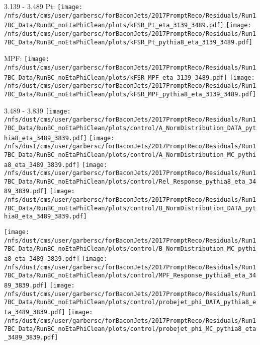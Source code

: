 \documentclass[t,compress]{beamer}
\begin{document}
\begin{frame}{3.139 - 3.489}
	 Pt: \texttt{[image: /nfs/dust/cms/user/garbersc/forBaconJets/2017PromptReco/Residuals/Run17BC\_Data/RunBC\_noEtaPhiClean/plots/kFSR\_Pt\_eta\_3139\_3489.pdf]}
	\texttt{[image: /nfs/dust/cms/user/garbersc/forBaconJets/2017PromptReco/Residuals/Run17BC\_Data/RunBC\_noEtaPhiClean/plots/kFSR\_Pt\_pythia8\_eta\_3139\_3489.pdf]}
\newline

	 MPF: \texttt{[image: /nfs/dust/cms/user/garbersc/forBaconJets/2017PromptReco/Residuals/Run17BC\_Data/RunBC\_noEtaPhiClean/plots/kFSR\_MPF\_eta\_3139\_3489.pdf]}
	\texttt{[image: /nfs/dust/cms/user/garbersc/forBaconJets/2017PromptReco/Residuals/Run17BC\_Data/RunBC\_noEtaPhiClean/plots/kFSR\_MPF\_pythia8\_eta\_3139\_3489.pdf]}
\end{frame}

\begin{frame}{3.489 - 3.839}
	\texttt{[image: /nfs/dust/cms/user/garbersc/forBaconJets/2017PromptReco/Residuals/Run17BC\_Data/RunBC\_noEtaPhiClean/plots/control/A\_NormDistribution\_DATA\_pythia8\_eta\_3489\_3839.pdf]}
	\texttt{[image: /nfs/dust/cms/user/garbersc/forBaconJets/2017PromptReco/Residuals/Run17BC\_Data/RunBC\_noEtaPhiClean/plots/control/A\_NormDistribution\_MC\_pythia8\_eta\_3489\_3839.pdf]}
	\texttt{[image: /nfs/dust/cms/user/garbersc/forBaconJets/2017PromptReco/Residuals/Run17BC\_Data/RunBC\_noEtaPhiClean/plots/control/Rel\_Response\_pythia8\_eta\_3489\_3839.pdf]}
	\texttt{[image: /nfs/dust/cms/user/garbersc/forBaconJets/2017PromptReco/Residuals/Run17BC\_Data/RunBC\_noEtaPhiClean/plots/control/B\_NormDistribution\_DATA\_pythia8\_eta\_3489\_3839.pdf]}
\newline

	\texttt{[image: /nfs/dust/cms/user/garbersc/forBaconJets/2017PromptReco/Residuals/Run17BC\_Data/RunBC\_noEtaPhiClean/plots/control/B\_NormDistribution\_MC\_pythia8\_eta\_3489\_3839.pdf]}
	\texttt{[image: /nfs/dust/cms/user/garbersc/forBaconJets/2017PromptReco/Residuals/Run17BC\_Data/RunBC\_noEtaPhiClean/plots/control/MPF\_Response\_pythia8\_eta\_3489\_3839.pdf]}
	\texttt{[image: /nfs/dust/cms/user/garbersc/forBaconJets/2017PromptReco/Residuals/Run17BC\_Data/RunBC\_noEtaPhiClean/plots/control/probejet\_phi\_DATA\_pythia8\_eta\_3489\_3839.pdf]}
	\texttt{[image: /nfs/dust/cms/user/garbersc/forBaconJets/2017PromptReco/Residuals/Run17BC\_Data/RunBC\_noEtaPhiClean/plots/control/probejet\_phi\_MC\_pythia8\_eta\_3489\_3839.pdf]}
\end{frame}
\end{document}
